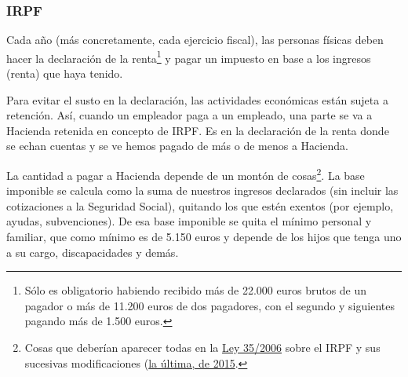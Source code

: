 \documentclass[nochap,palatino,notitlepage]{apuntes}
\begin{document}
\subsubsection{IRPF}

Cada año (más concretamente, cada ejercicio fiscal), las personas físicas deben hacer la declaración de la renta\footnote{Sólo es obligatorio habiendo recibido más de 22.000 euros brutos de un pagador o más de 11.200 euros de dos pagadores, con el segundo y siguientes pagando más de 1.500 euros.} y pagar un impuesto en base a los ingresos (renta) que haya tenido.

Para evitar el susto en la declaración, las actividades económicas están sujeta a retención. Así, cuando un empleador paga a un empleado, una parte se va a Hacienda retenida en concepto de IRPF\footnotemark. Es en la declaración de la renta donde se echan cuentas y se ve hemos pagado de más o de menos a Hacienda.


La cantidad a pagar a Hacienda depende de un montón de cosas\footnote{Cosas que deberían aparecer todas en la \href{https://www.boe.es/buscar/act.php?id=BOE-A-2006-20764&tn=1&vd=&p=20151030}{Ley 35/2006} sobre el IRPF y sus sucesivas modificaciones (\href{http://www.boe.es/diario_boe/txt.php?id=BOE-A-2015-7765}{la última, de 2015}.}. La base imponible se calcula como la suma de nuestros ingresos declarados (sin incluir las cotizaciones a la Seguridad Social), quitando los que estén exentos (por ejemplo, ayudas, subvenciones). De esa base imponible se quita el mínimo personal y familiar, que como mínimo es de 5.150 euros y depende de los hijos que tenga uno a su cargo, discapacidades y demás.
\end{document}
